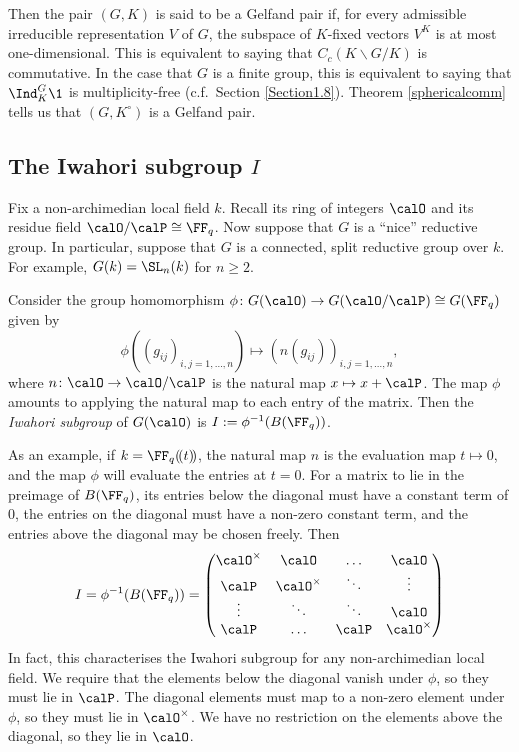 \documentclass[11pt]{amsart}
\theoremstyle{remark}
\begin{document}
Then the pair $(G,K)$ is said to be a Gelfand pair if, for every admissible irreducible representation $V$ of $G$, the subspace of $K$-fixed vectors $V^K$ is at most one-dimensional.
This is equivalent to saying that $C_c(K\backslash G/K)$ is commutative.
In the case that $G$ is a finite group, this is equivalent to saying that $\Ind_K^G \1$ is multiplicity-free (c.f.\ Section \ref{Section1.8}).
Theorem \ref{sphericalcomm} tells us that $(G,K^\circ)$ is a Gelfand pair.


\subsection{The Iwahori subgroup $I$}\label{Section5.4}
Fix a non-archimedian local field $k$.
Recall its ring of integers $\calO$ and its residue field $\calO/\calP\cong\FF_q$.
Now suppose that $G$ is a ``nice''  reductive group.
In particular, suppose that $G$ is a connected, split reductive group over $k$.
For example, $G(k)=\SL_n(k)$ for $n\geq 2$.

Consider the group homomorphism $\phi\colon G(\calO)\to G(\calO/\calP)\cong G(\FF_q)$ given by
\[
	\phi((g_{ij})_{i,j=1,\ldots,n})\mapsto (n(g_{ij}))_{i,j=1,\ldots,n},
\]
where $n\colon \calO\to\calO/\calP$ is the natural map $x\mapsto x+\calP$.
The map $\phi$ amounts to applying the natural map to each entry of the matrix.
Then the \emph{Iwahori subgroup} of $G(\calO)$ is $I:=\phi^{-1}(B(\FF_q))$.

As an example, if $k=\FF_q(\!(t)\!)$, the natural map $n$ is the evaluation map $t\mapsto 0$, and the map $\phi$ will evaluate the entries at $t=0$.
For a matrix to lie in the preimage of $B(\FF_q)$, its entries below the diagonal must have a constant term of $0$, the entries on the diagonal must have a non-zero constant term, and the entries above the diagonal may be chosen freely.
Then
\[
	I = \phi^{-1}(B(\FF_q)) = \begin{pmatrix}
		\calO^\times & \calO        & \hdots & \calO        \\
		\calP        & \calO^\times & \ddots & \vdots       \\
		\vdots       & \ddots       & \ddots & \calO        \\
		\calP        & \hdots       & \calP  & \calO^\times
	\end{pmatrix}
\]
In fact, this characterises the Iwahori subgroup for any non-archimedian local field.
We require that the elements below the diagonal vanish under $\phi$, so they must lie in $\calP$.
The diagonal elements must map to a non-zero element under $\phi$, so they must lie in $\calO^\times$.
We have no restriction on the elements above the diagonal, so they lie in $\calO$.
\end{document}
